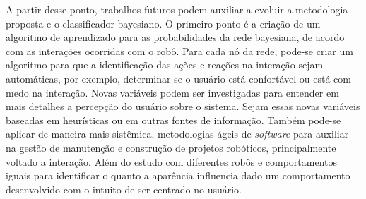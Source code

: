 A partir desse ponto, trabalhos futuros podem auxiliar a evoluir a metodologia proposta e o classificador bayesiano. O primeiro ponto é a criação de um algoritmo de aprendizado para as probabilidades da rede bayesiana, de acordo com as interações ocorridas com o robô. Para cada nó da rede, pode-se criar um algoritmo para que a identificação das ações e reações na interação sejam automáticas, por exemplo, determinar se o usuário está confortável ou está com medo na interação. Novas variáveis podem ser investigadas para entender em mais detalhes a percepção do usuário sobre o sistema. Sejam essas novas variáveis baseadas em heurísticas ou em outras fontes de informação. Também pode-se aplicar de maneira mais sistêmica, metodologias ágeis de \emph{software} para auxiliar na gestão de manutenção e construção de projetos robóticos, principalmente voltado a interação. Além do estudo com diferentes robôs e comportamentos iguais para identificar o quanto a aparência influencia dado um comportamento desenvolvido com o intuito de ser centrado no usuário.